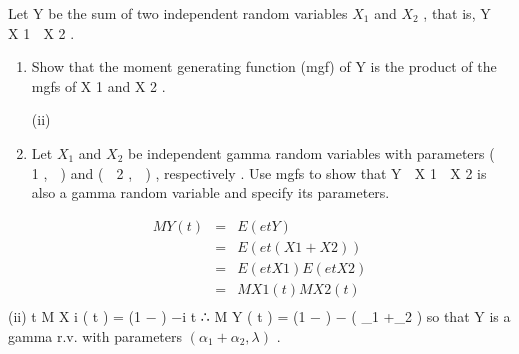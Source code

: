 \documentclass[a4paper,12pt]{article}
\begin{document}
Let Y be the sum of two independent random variables $X_1$ and $X_2$ , that is,
Y  X 1  X 2 .
\begin{enumerate} 
\item Show that the moment generating function (mgf) of Y is the product of the
mgfs of X 1 and X 2 .

(ii)
\item Let $X_1$ and $X_2$ be independent gamma random variables with parameters
(  1 ,  ) and (  2 ,  ) , respectively .
Use mgfs to show that Y  X 1  X 2 is also a gamma random variable and
specify its parameters.

\end{enumerate}

\newpage


\begin{eqnarray*}
M Y ( t ) &=& E ( e tY ) \\ &=& E ( e t ( X 1 + X 2 ) )
\\ &=& E ( e tX 1 ) E ( e tX 2 ) \\ &=& M X 1 ( t ) M X 2 ( t )\\
\end{eqnarray*}
(ii)
t
M X i ( t ) = (1 − ) −\alpha  i
\lambda 
t
∴ M Y ( t ) = (1 − ) − ( \alpha_{1} +\alpha_{2} )
\lambda 
so that Y is a gamma r.v. with parameters $( \alpha_{1} + \alpha_{2} , \lambda  )$ .


\end{document}
